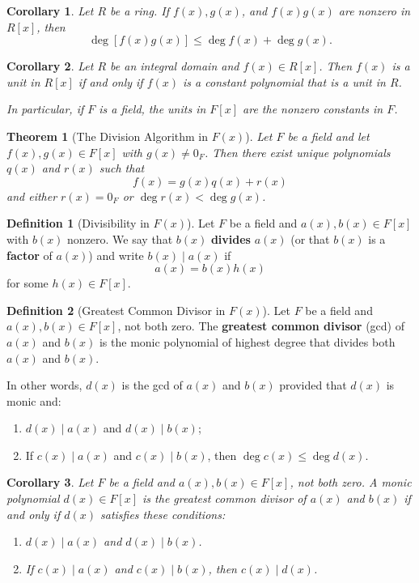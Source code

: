 \documentclass{article}
\newtheorem{theorem}{Theorem}[section]
\newtheorem{corollary}{Corollary}[section]
\theoremstyle{definition}
\newtheorem{definition}{Definition}[section]
\theoremstyle{remark}
\begin{document}
\begin{corollary} \label{cor:degree inequality}
Let $R$ be a ring. If $f(x), g(x)$, and $f(x)g(x)$ are nonzero in $R[x]$, then
\[
\deg [f(x)g(x)] \leq \deg f(x) + \deg g(x).
\]
\end{corollary}



\begin{corollary} \label{cor:units in polynomial ring}
Let $R$ be an integral domain and $f(x) \in R[x]$. Then $f(x)$ is a unit in $R[x]$ if and only if $f(x)$ is a constant polynomial that is a unit in $R$. 

In particular, if $F$ is a field, the units in $F[x]$ are the nonzero constants in $F$.
\end{corollary}




\begin{theorem}[The Division Algorithm in $F(x)$] \label{thm:division algorithm for polynomial}
Let $F$ be a field and let $f(x), g(x) \in F[x]$ with $g(x) \neq 0_F$. Then there exist unique polynomials $q(x)$ and $r(x)$ such that
\[
f(x) = g(x)q(x) + r(x)
\]
and either $r(x) = 0_F$ or $\deg r(x) < \deg g(x)$.
\end{theorem}


\begin{definition}[Divisibility in $F(x)$]
Let $F$ be a field and $a(x), b(x) \in F[x]$ with $b(x)$ nonzero. We say that $b(x)$ \textbf{divides} $a(x)$ (or that $b(x)$ is a \textbf{factor} of $a(x)$) and write $b(x) \mid a(x)$ if
\[
a(x) = b(x) h(x)
\]
for some $h(x) \in F[x]$.
\end{definition}


\begin{definition}[Greatest Common Divisor in $F(x)$]
Let $F$ be a field and $a(x), b(x) \in F[x]$, not both zero. The \textbf{greatest common divisor} (gcd) of $a(x)$ and $b(x)$ is the monic polynomial of highest degree that divides both $a(x)$ and $b(x)$. 

In other words, $d(x)$ is the gcd of $a(x)$ and $b(x)$ provided that $d(x)$ is monic and:
\begin{enumerate}
\item $d(x) \mid a(x)$ and $d(x) \mid b(x)$;
\item If $c(x) \mid a(x)$ and $c(x) \mid b(x)$, then $\deg c(x) \leq \deg d(x)$.
\end{enumerate}
\end{definition}


\begin{corollary} \label{cor:gcd characterization}
Let $F$ be a field and $a(x), b(x) \in F[x]$, not both zero. A monic polynomial $d(x) \in F[x]$ is the greatest common divisor of $a(x)$ and $b(x)$ if and only if $d(x)$ satisfies these conditions:
\begin{enumerate}
\item $d(x) \mid a(x)$ and $d(x) \mid b(x)$.
\item If $c(x) \mid a(x)$ and $c(x) \mid b(x)$, then $c(x) \mid d(x)$.
\end{enumerate}
\end{corollary}
\end{document}
